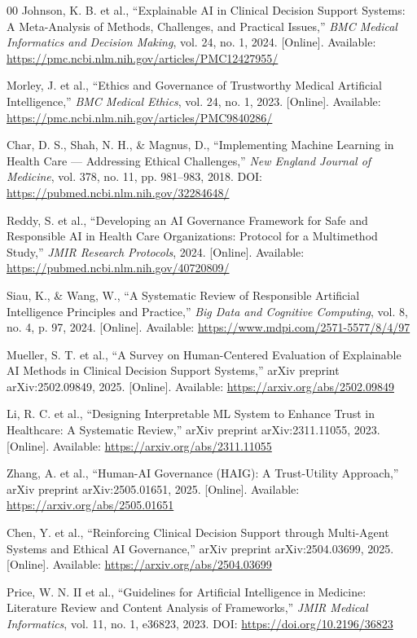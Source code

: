\documentclass[conference]{IEEEtran}
\begin{document}
\begin{thebibliography}{00}
 Johnson, K. B. et al., ``Explainable AI in Clinical Decision Support Systems: A Meta-Analysis of Methods, Challenges, and Practical Issues,'' \textit{BMC Medical Informatics and Decision Making}, vol. 24, no. 1, 2024. [Online]. Available: \url{https://pmc.ncbi.nlm.nih.gov/articles/PMC12427955/}

 Morley, J. et al., ``Ethics and Governance of Trustworthy Medical Artificial Intelligence,'' \textit{BMC Medical Ethics}, vol. 24, no. 1, 2023. [Online]. Available: \url{https://pmc.ncbi.nlm.nih.gov/articles/PMC9840286/}

 Char, D. S., Shah, N. H., \& Magnus, D., ``Implementing Machine Learning in Health Care — Addressing Ethical Challenges,'' \textit{New England Journal of Medicine}, vol. 378, no. 11, pp. 981--983, 2018. DOI: \url{https://pubmed.ncbi.nlm.nih.gov/32284648/}

 Reddy, S. et al., ``Developing an AI Governance Framework for Safe and Responsible AI in Health Care Organizations: Protocol for a Multimethod Study,'' \textit{JMIR Research Protocols}, 2024. [Online]. Available: \url{https://pubmed.ncbi.nlm.nih.gov/40720809/}

 Siau, K., \& Wang, W., ``A Systematic Review of Responsible Artificial Intelligence Principles and Practice,'' \textit{Big Data and Cognitive Computing}, vol. 8, no. 4, p. 97, 2024. [Online]. Available: \url{https://www.mdpi.com/2571-5577/8/4/97}

 Mueller, S. T. et al., ``A Survey on Human-Centered Evaluation of Explainable AI Methods in Clinical Decision Support Systems,'' arXiv preprint arXiv:2502.09849, 2025. [Online]. Available: \url{https://arxiv.org/abs/2502.09849}

 Li, R. C. et al., ``Designing Interpretable ML System to Enhance Trust in Healthcare: A Systematic Review,'' arXiv preprint arXiv:2311.11055, 2023. [Online]. Available: \url{https://arxiv.org/abs/2311.11055}

 Zhang, A. et al., ``Human-AI Governance (HAIG): A Trust-Utility Approach,'' arXiv preprint arXiv:2505.01651, 2025. [Online]. Available: \url{https://arxiv.org/abs/2505.01651}

 Chen, Y. et al., ``Reinforcing Clinical Decision Support through Multi-Agent Systems and Ethical AI Governance,'' arXiv preprint arXiv:2504.03699, 2025. [Online]. Available: \url{https://arxiv.org/abs/2504.03699}

 Price, W. N. II et al., ``Guidelines for Artificial Intelligence in Medicine: Literature Review and Content Analysis of Frameworks,'' \textit{JMIR Medical Informatics}, vol. 11, no. 1, e36823, 2023. DOI: \url{https://doi.org/10.2196/36823}
\end{thebibliography}
\end{document}
